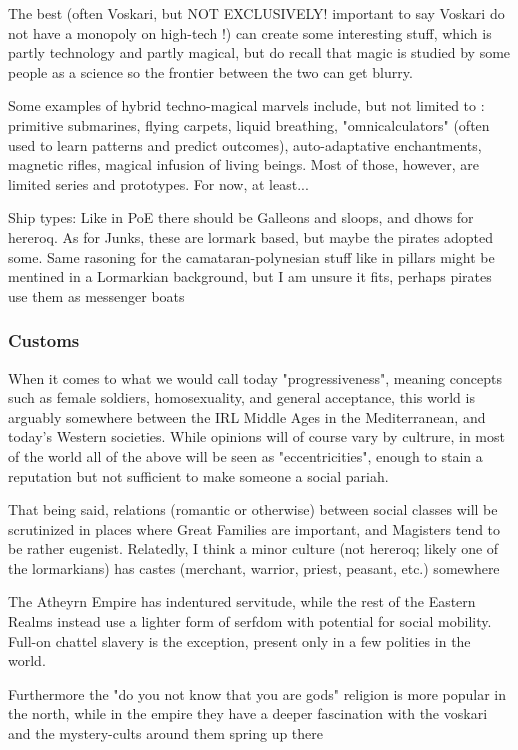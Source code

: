 The best (often Voskari, but NOT EXCLUSIVELY! important to say Voskari do not have a monopoly on high-tech !) can create some interesting stuff, which is partly technology and partly magical, but do recall that magic is studied by some people as a science so the frontier between the two can get blurry.


Some examples of hybrid techno-magical marvels include, but not limited to : primitive submarines, flying carpets, liquid breathing, "omnicalculators" (often used to learn patterns and predict outcomes), auto-adaptative enchantments, magnetic rifles, magical infusion of living beings. Most of those, however, are limited series and prototypes. For now, at least...




Ship types:
	Like in PoE there should be Galleons and sloops, and dhows for hereroq.
	As for Junks, these are lormark based, but maybe the pirates adopted some. Same rasoning for the camataran-polynesian stuff like in pillars might be mentined in a Lormarkian background, but I am unsure it fits, perhaps pirates use them as messenger boats



\subsubsection{Customs}

When it comes to what we would call today "progressiveness", meaning concepts such as female soldiers, homosexuality, and general acceptance, this world is arguably somewhere between the IRL Middle Ages in the Mediterranean, and today's Western societies. While opinions will of course vary by cultrure, in most of the world all of the above will be seen as "eccentricities", enough to stain a reputation but not sufficient to make someone a social pariah.

That being said, relations (romantic or otherwise) between social classes will be scrutinized in places where Great Families are important, and Magisters tend to be rather eugenist. Relatedly, I think a minor culture (not hereroq; likely one of the lormarkians) has castes (merchant, warrior, priest, peasant, etc.) somewhere

The Atheyrn Empire has indentured servitude, while the rest of the Eastern Realms instead use a lighter form of serfdom with potential for social mobility. Full-on chattel slavery is the exception, present only in a few polities in the world.

Furthermore the "do you not know that you are gods" religion is more popular in the north, while in the empire they have a deeper fascination with the voskari and the mystery-cults around them spring up there


